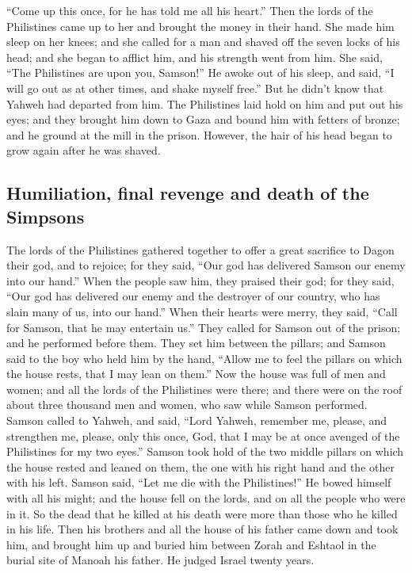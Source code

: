 \begin{paracol}{2}
\begin{otherlanguage}{english}
``Come up this once, for he has told me all his heart.'' Then the lords
of the Philistines came up to her and brought the money in their hand.
 She made him sleep on her knees; and she called for a
man and shaved off the seven locks of his head; and she began to afflict
him, and his strength went from him.  She said, ``The
Philistines are upon you, Samson!'' He awoke out of his sleep, and said,
``I will go out as at other times, and shake myself free.'' But he
didn't know that Yahweh had departed from him.  The
Philistines laid hold on him and put out his eyes; and they brought him
down to Gaza and bound him with fetters of bronze; and he ground at the
mill in the prison.  However, the hair of his head began
to grow again after he was shaved.

\hypertarget{humiliation-final-revenge-and-death-of-the-simpsons}{%
\subsection{Humiliation, final revenge and death of the
Simpsons}\label{humiliation-final-revenge-and-death-of-the-simpsons}}

 The lords of the Philistines gathered together to offer
a great sacrifice to Dagon their god, and to rejoice; for they said,
``Our god has delivered Samson our enemy into our hand.''
 When the people saw him, they praised their god; for
they said, ``Our god has delivered our enemy and the destroyer of our
country, who has slain many of us, into our hand.''  When
their hearts were merry, they said, ``Call for Samson, that he may
entertain us.'' They called for Samson out of the prison; and he
performed before them. They set him between the pillars; 
and Samson said to the boy who held him by the hand, ``Allow me to feel
the pillars on which the house rests, that I may lean on them.''
 Now the house was full of men and women; and all the
lords of the Philistines were there; and there were on the roof about
three thousand men and women, who saw while Samson performed.
 Samson called to Yahweh, and said, ``Lord Yahweh,
remember me, please, and strengthen me, please, only this once, God,
that I may be at once avenged of the Philistines for my two eyes.''
 Samson took hold of the two middle pillars on which the
house rested and leaned on them, the one with his right hand and the
other with his left.  Samson said, ``Let me die with the
Philistines!'' He bowed himself with all his might; and the house fell
on the lords, and on all the people who were in it. So the dead that he
killed at his death were more than those who he killed in his life.
 Then his brothers and all the house of his father came
down and took him, and brought him up and buried him between Zorah and
Eshtaol in the burial site of Manoah his father. He judged Israel twenty
years.


\end{otherlanguage}
\end{paracol}
